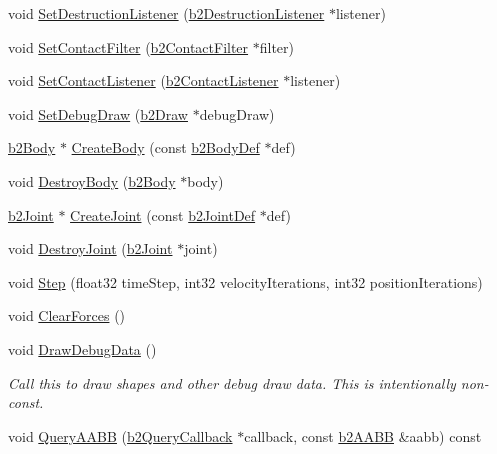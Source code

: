 \begin{DoxyCompactItemize}
void \hyperlink{classb2World_ae377f2dd5512ada7d27f4ad3541c75bf}{Set\+Destruction\+Listener} (\hyperlink{classb2DestructionListener}{b2\+Destruction\+Listener} $\ast$listener)
\item 
void \hyperlink{classb2World_a85e6e1e911c7d6366f8c7d57a12b72ff}{Set\+Contact\+Filter} (\hyperlink{classb2ContactFilter}{b2\+Contact\+Filter} $\ast$filter)
\item 
void \hyperlink{classb2World_a614549967fb8a1584b61c11e2d553d42}{Set\+Contact\+Listener} (\hyperlink{classb2ContactListener}{b2\+Contact\+Listener} $\ast$listener)
\item 
void \hyperlink{classb2World_a6976d2c67400df03c0d44174ffcfb7ee}{Set\+Debug\+Draw} (\hyperlink{classb2Draw}{b2\+Draw} $\ast$debug\+Draw)
\item 
\hyperlink{classb2Body}{b2\+Body} $\ast$ \hyperlink{classb2World_a9323d553e4c132b26d8741b457d7c034}{Create\+Body} (const \hyperlink{structb2BodyDef}{b2\+Body\+Def} $\ast$def)
\item 
void \hyperlink{classb2World_ad52231ad7a9556ef5735ac79cbcd8fcf}{Destroy\+Body} (\hyperlink{classb2Body}{b2\+Body} $\ast$body)
\item 
\hyperlink{classb2Joint}{b2\+Joint} $\ast$ \hyperlink{classb2World_a8a408c367fe133530f3e577c667d1efd}{Create\+Joint} (const \hyperlink{structb2JointDef}{b2\+Joint\+Def} $\ast$def)
\item 
void \hyperlink{classb2World_add5942aef171e54cfa384c8975746dca}{Destroy\+Joint} (\hyperlink{classb2Joint}{b2\+Joint} $\ast$joint)
\item 
void \hyperlink{classb2World_a7a8eff61af98461f978fe43f3af7be90}{Step} (float32 time\+Step, int32 velocity\+Iterations, int32 position\+Iterations)
\item 
void \hyperlink{classb2World_ac082ab4c4ad0b1c5ec4674315eeec643}{Clear\+Forces} ()
\item 
\mbox{\label{classb2World_a293d9865e407fd463e168b0a29856acc}} 
void \hyperlink{classb2World_a293d9865e407fd463e168b0a29856acc}{Draw\+Debug\+Data} ()
\begin{DoxyCompactList}\small\item\em Call this to draw shapes and other debug draw data. This is intentionally non-\/const. \end{DoxyCompactList}\item 
void \hyperlink{classb2World_ad169fae775be1e1f16386f7587786fa8}{Query\+A\+A\+BB} (\hyperlink{classb2QueryCallback}{b2\+Query\+Callback} $\ast$callback, const \hyperlink{structb2AABB}{b2\+A\+A\+BB} \&aabb) const

\end{DoxyCompactItemize}
